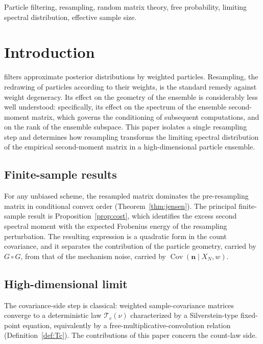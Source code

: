 \documentclass[lettersize,journal]{IEEEtran}
\theoremstyle{remark}
\begin{document}
\begin{IEEEkeywords}
Particle filtering, resampling, random matrix theory, free probability, limiting spectral distribution, effective sample size.
\end{IEEEkeywords}

\section{Introduction}
\label{sec:intro}

 filters approximate posterior distributions by weighted particles\cite{doucet2011tutorial}\cite{delmoral2004feynman}. Resampling, the redrawing of particles according to their weights, is the
standard remedy against weight degeneracy\cite{kong1994sequential}. Its effect on the geometry of the
ensemble is considerably less well understood: specifically, its effect on the
spectrum of the ensemble second-moment matrix, which governs the conditioning
of subsequent computations, and on the rank of the ensemble subspace. This
paper isolates a single resampling step and determines how resampling
transforms the limiting spectral distribution of the empirical second-moment
matrix in a high-dimensional particle ensemble.

\subsection{Finite-sample results}

For any unbiased scheme, the resampled matrix dominates the pre-resampling
matrix in conditional convex order (Theorem~\ref{thm:jensen}). The principal
finite-sample result is Proposition~\ref{prop:cost}, which identifies the
excess second spectral moment with the expected Frobenius energy of the
resampling perturbation. The resulting expression is a quadratic form in the
count covariance, and it separates the contribution of the particle geometry,
carried by $G\circ G$, from that of the mechanism noise, carried by
$\operatorname{Cov}(\bm{n}\mid X_N,w)$.

\subsection{High-dimensional limit}

The covariance-side step is classical: weighted sample-covariance matrices
converge to a deterministic law $\mathcal{T}_c(\nu)$ characterized by a
Silverstein-type fixed-point equation, equivalently by a
free-multiplicative-convolution relation (Definition~\ref{def:Tc}). The
contributions of this paper concern the count-law side.
\end{document}
